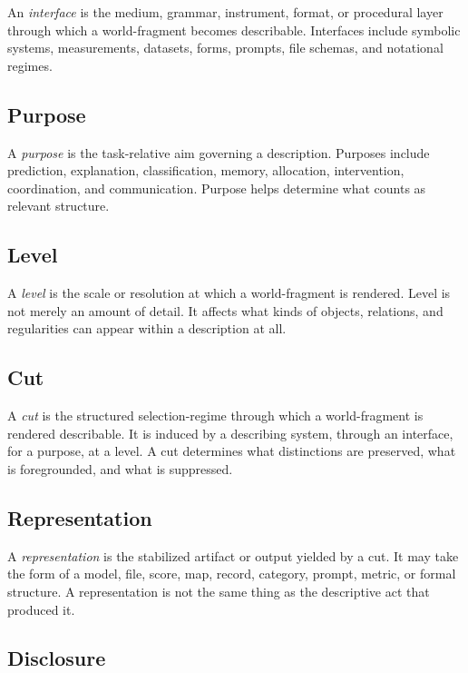 \documentclass[11pt]{article}
\renewcommand{\emph}[1]{\textit{#1}}
\begin{document}
An \emph{interface} is the medium, grammar, instrument, format, or procedural layer through which a world-fragment becomes describable. Interfaces include symbolic systems, measurements, datasets, forms, prompts, file schemas, and notational regimes.

\subsection*{Purpose}

A \emph{purpose} is the task-relative aim governing a description. Purposes include prediction, explanation, classification, memory, allocation, intervention, coordination, and communication. Purpose helps determine what counts as relevant structure.

\subsection*{Level}

A \emph{level} is the scale or resolution at which a world-fragment is rendered. Level is not merely an amount of detail. It affects what kinds of objects, relations, and regularities can appear within a description at all.

\subsection*{Cut}

A \emph{cut} is the structured selection-regime through which a world-fragment is rendered describable. It is induced by a describing system, through an interface, for a purpose, at a level. A cut determines what distinctions are preserved, what is foregrounded, and what is suppressed.

\subsection*{Representation}

A \emph{representation} is the stabilized artifact or output yielded by a cut. It may take the form of a model, file, score, map, record, category, prompt, metric, or formal structure. A representation is not the same thing as the descriptive act that produced it.

\subsection*{Disclosure}
\end{document}
